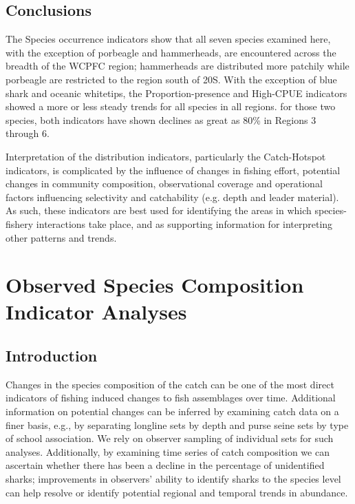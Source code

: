 \documentclass[12pt]{SCreport}
\begin{document}
     
          
  \subsection{Conclusions}
  
The Species occurrence indicators show that all seven species examined here, with the exception of porbeagle and hammerheads, are encountered across the breadth of the WCPFC region; hammerheads are distributed more patchily while porbeagle are restricted to the region south of 20\degree{}S. With the exception of blue shark and oceanic whitetips, the Proportion-presence and High-CPUE indicators showed a more or less steady trends for all species in all regions.  for those two species, both indicators have shown declines as great as 80\% in Regions 3 through 6.  
  
Interpretation of the distribution indicators, particularly the Catch-Hotspot indicators, is complicated by the influence of changes in fishing effort,  potential  changes in community composition, observational coverage  and operational factors influencing selectivity and catchability (e.g. depth and leader material). As such, these indicators are best used for identifying the areas in which species-fishery interactions take place, and as supporting information for interpreting other patterns and trends. 

      
      
\section{Observed Species Composition Indicator Analyses}

 \subsection{Introduction}
Changes in the species composition of the catch can be one of the most direct indicators of fishing induced changes to fish assemblages over time. Additional information on potential changes can be inferred by examining catch data on a finer basis, e.g., by separating longline sets by depth and purse seine sets by type of school association. We rely on observer sampling of individual sets for such analyses. Additionally, by examining time series of catch composition we can ascertain whether there has been a decline in the percentage of unidentified sharks; improvements in observers’ ability to identify sharks to the species level can help resolve or identify potential regional and temporal trends in abundance.
\end{document}
